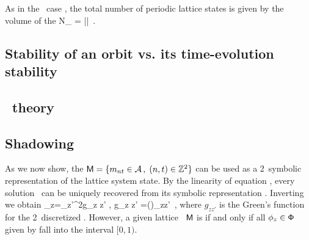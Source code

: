 As in the \templatt\ case , the total number of periodic
lattice states is given by the volume of the {\fundPip}
\beq
N_\cl{} = |\Det\jMorb|
\,.

\subsection{Stability of an orbit vs. its time-evolution stability}
\label{s:catLattHill}

\subsection{\Po\ theory}
\label{s:catLattPoThe}



\subsection{Shadowing}
\label{s:catLattShadow}



As we now show, the
{\brick}
\(
\mathsf{M}= \{{m_{nt}} \in \mathcal{A} \,,\; (n,t)\in \mathbb{Z}^2 \}
\)
can be used as a 2\dmn\ symbolic representation of the lattice system
state.
By the linearity of equation , every solution \Xx\
can be uniquely recovered from its symbolic representation \Mm. Inverting
\refeq{2dCoupledCats} we obtain
\beq
  \ssp_{z}=\sum_{z'\in\integers^2}g_{z z'} , \qquad  g_{z z' }
       =\left(\frac{1}{-\Box +2(s -2)}\right)_{zz'}
       \,,
where  $g_{z z'}$
is the  Green's
function for the 2\dmn\ discretized \sPe.
However, a given lattice \brick\ $\mathsf{M}$ %
is \emph{{\admissible}} if and only if all  $\phi_{z}\in \mathsf{\Phi}$ given by
\refeq{GreenFuncCoupled} fall into the interval $[0,1)$.

